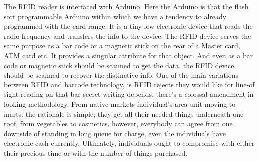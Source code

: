 \documentclass[12pt]{article}
\begin{document}
\hspace*{1 cm}The RFID reader is interfaced with Arduino. Here the Arduino is that the flash sort programmable Arduino within which we have a tendency to already programmed with the card range. It is a tiny low electronic device that reads the radio frequency and transfers the info to the device. The RFID device serves the same purpose as a bar code or a magnetic stick on the rear of a Master card, ATM card etc. It provides a singular attribute for that object. And even as a bar code or magnetic stick should be scanned to get the data, the RFID device should be scanned to recover the distinctive info. One of the main variations between RFID and barcode technology, is RFID rejects they would like for line-of sight reading on that bar secret writing depends. there's a colossal amendment in looking methodology. From native markets individual's area unit moving to marts. the rationale is simple; they get all their needed things underneath one roof, from vegetables to cosmetics. however, everybody can agree from one downside of standing in long queue for charge, even the individuals have electronic cash currently. Ultimately, individuals ought to compromise with either their precious time or with the number of things purchased.
\end{document}
